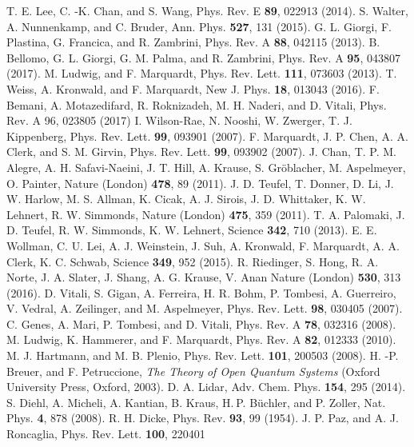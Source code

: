 \documentclass[a4paper]{jpconf}
\begin{document}
\begin{thebibliography}{99}
 T. E. Lee, C. -K. Chan, and S. Wang, Phys. Rev. E \textbf{89}, 022913 (2014).
 S. Walter, A. Nunnenkamp, and C. Bruder, Ann. Phys. \textbf{527}, 131 (2015).
 G. L. Giorgi, F. Plastina, G. Francica, and R. Zambrini, Phys. Rev. A \textbf{88}, 042115 (2013).
 B. Bellomo, G. L. Giorgi, G. M. Palma, and R. Zambrini, Phys. Rev. A \textbf{95}, 043807 (2017).
 M. Ludwig, and F. Marquardt, Phys. Rev. Lett. \textbf{111}, 073603 (2013).
 T. Weiss, A. Kronwald, and F. Marquardt, New J. Phys. \textbf{18}, 013043 (2016).
 F. Bemani, A. Motazedifard, R. Roknizadeh, M. H. Naderi, and D. Vitali, Phys. Rev. A 96, 023805 (2017)
 I. Wilson-Rae, N. Nooshi, W. Zwerger, T. J. Kippenberg, Phys. Rev. 
Lett. \textbf{99}, 093901 (2007).
 F. Marquardt, J. P. Chen, A. A. Clerk, and S. M. Girvin, Phys. Rev. 
Lett. \textbf{99}, 093902 (2007).
 J. Chan, T. P. M. Alegre, A. H. Safavi-Naeini, J. T. Hill, A. Krause, S. 
Gröblacher, M. Aspelmeyer, O. Painter, Nature (London) \textbf{478}, 89 (2011).
 J. D. Teufel, T. Donner, D. Li, J. W. Harlow, M. S. Allman, K. Cicak, 
A. J. Sirois, J. D. Whittaker, K. W. Lehnert, R. W. Simmonds, Nature (London) 
\textbf{475}, 359 (2011).
 T. A. Palomaki, J. D. Teufel, R. W. Simmonds, K. W. Lehnert, Science 
\textbf{342}, 710 (2013).
 E. E. Wollman, C. U. Lei, A. J. Weinstein, J. Suh, A. Kronwald, F. 
Marquardt, A. A. Clerk, K. C. Schwab, Science \textbf{349}, 952 (2015).
 R. Riedinger, S. Hong, R. A. Norte, J. A. Slater, J. Shang, A. G. 
Krause, V. Anan Nature (London) \textbf{530}, 313 (2016).
 D. Vitali, S. Gigan, A. Ferreira, H. R. Bohm, P. Tombesi, A. 
Guerreiro, V. Vedral, A. Zeilinger, and M. Aspelmeyer, Phys. Rev. Lett. 
\textbf{98}, 030405 (2007).
 C. Genes, A. Mari, P. Tombesi, and D. Vitali, Phys. Rev. A 
\textbf{78}, 032316 (2008).
 M. Ludwig, K. Hammerer, and F. Marquardt, Phys. Rev. A \textbf{82}, 
012333 (2010).
 M. J. Hartmann, and M. B. Plenio, Phys. Rev. Lett. \textbf{101}, 200503 (2008).
 H. -P. Breuer, and F. Petruccione, \textit{The Theory of Open Quantum 
Systems} (Oxford University Press, Oxford, 2003).
 D. A. Lidar, Adv. Chem. Phys. \textbf{154}, 295 (2014).
 S. Diehl, A. Micheli, A. Kantian, B. Kraus, H. P. Büchler, and P. Zoller, Nat. Phys. \textbf{4}, 878 (2008).
 R. H. Dicke, Phys. Rev. \textbf{93}, 99 (1954).
 J. P. Paz, and A. J. Roncaglia, Phys. Rev. Lett. \textbf{100}, 220401 

\end{thebibliography}
\end{document}
